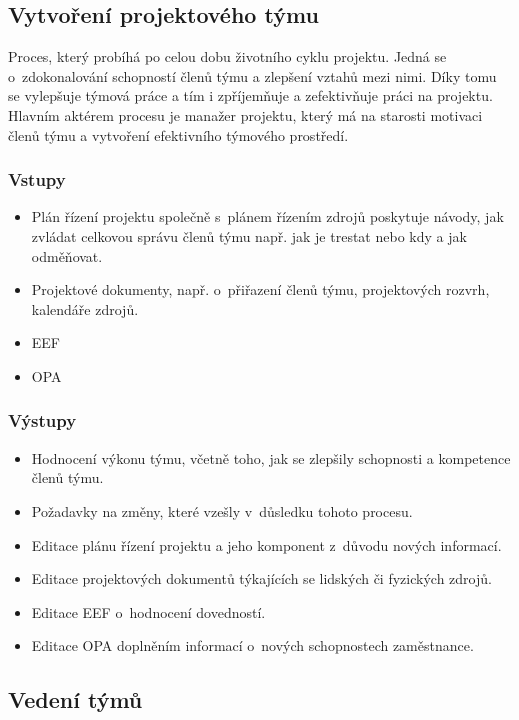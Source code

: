 \subsection*{Vytvoření projektového týmu}

Proces, který probíhá po celou dobu životního cyklu projektu. Jedná se o~zdokonalování schopností členů týmu a zlepšení vztahů mezi nimi. Díky tomu se vylepšuje týmová práce a tím i zpříjemňuje a zefektivňuje práci na projektu. Hlavním aktérem procesu je manažer projektu, který má na starosti motivaci členů týmu a vytvoření efektivního týmového prostředí.

\subsubsection*{Vstupy}
\begin{itemize}
    \item Plán řízení projektu společně s~plánem řízením zdrojů poskytuje návody, jak zvládat celkovou správu členů týmu např. jak je trestat nebo kdy a jak odměňovat.
    \item Projektové dokumenty, např. o~přiřazení členů týmu, projektových rozvrh, kalendáře zdrojů.
    \item EEF
    \item OPA
\end{itemize}
\subsubsection*{Výstupy}
\begin{itemize}
    \item Hodnocení výkonu týmu, včetně toho, jak se zlepšily schopnosti a kompetence členů týmu. 
    \item Požadavky na změny, které vzešly v~důsledku tohoto procesu.
    \item Editace plánu řízení projektu a jeho komponent z~důvodu nových informací. 
    \item Editace projektových dokumentů týkajících se lidských či fyzických zdrojů.
    \item Editace EEF o~hodnocení dovedností.
    \item Editace OPA doplněním informací o~nových schopnostech zaměstnance.
\end{itemize}

\subsection*{Vedení týmů}

